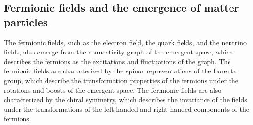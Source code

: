 \subsection{Fermionic fields and the emergence of matter particles}
The fermionic fields, such as the electron field, the quark fields, and the neutrino fields, also emerge from the connectivity graph of the emergent space, which describes the fermions as the excitations and fluctuations of the graph. The fermionic fields are characterized by the spinor representations of the Lorentz group, which describe the transformation properties of the fermions under the rotations and boosts of the emergent space. The fermionic fields are also characterized by the chiral symmetry, which describes the invariance of the fields under the transformations of the left-handed and right-handed components of the fermions.

